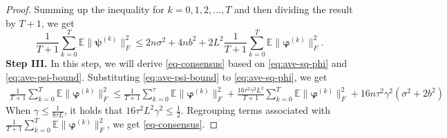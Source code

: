 \documentclass{article}
\newcommand{\vphi}{\bm{\varphi}}
\newcommand{\vpsi}{\bm{\psi}}
\newcommand{\ko}{{(k)}}
\newcommand{\bbE}{\mathbb{E}}
\newcommand{\avekT}{\frac{1}{T+1}\sum_{k=0}^T}
\theoremstyle{plain}
\theoremstyle{definition}
\begin{document}
\begin{proof}
Summing up the inequality for $k=0,1,2,\ldots,T$ and then dividing the result by $T+1$, we get 
\begin{equation}
\label{eq:ave-psi-bound}
\avekT\bbE\|\vpsi^\ko\|^2_F\leq 2n\sigma^2+4nb^2+2L^2\avekT\bbE\|\vphi^\ko\|^2_F.
\end{equation}
\textbf{Step III.} In this step, we will derive \eqref{eq-consensus} based on \eqref{eq:ave-sq-phi} and \eqref{eq:ave-psi-bound}. Substituting \eqref{eq:ave-psi-bound} to \eqref{eq:ave-sq-phi}, we get
\begin{align}
\avekT \bbE\|\vphi^\ko\|^2_F
\leq \frac{1}{T+1}\sum_{k=0}^\tau\bbE\|\vphi^\ko\|^2_F+\frac{16\tau^2\gamma^2L^2}{T+1}\sum_{k=0}^T \bbE\|\vphi^\ko\|^2_F + 16n\tau^2\gamma^2(\sigma^2 + 2b^2) 
\end{align}
When $\gamma \le \frac{1}{8\tau L}$, it holds that $16\tau^2L^2\gamma^2 \le \frac{1}{2}$. Regrouping terms associated with $\avekT \bbE\|\vphi^\ko\|^2_F$, we get \eqref{eq-consensus}.
\end{proof}
\end{document}
